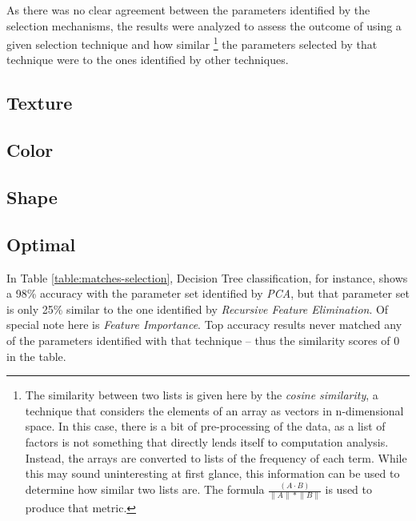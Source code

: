 \documentclass[letterpaper]{article}
\begin{document}
{As there was no clear agreement between the parameters identified by the selection mechanisms, the results were analyzed to assess the outcome of using a given selection technique and how similar 
\footnote{The similarity between two lists is given here by the \textit{cosine similarity}, a technique that considers the elements of an array as vectors in n-dimensional space. In this case, there is a bit of pre-processing of the data, as a list of factors is not something that directly lends itself to computation analysis. Instead, the arrays are converted to lists of the frequency of each term. While this may sound uninteresting at first glance, this information can be used to determine how similar two lists are. The formula $\frac {(A \cdot B)} { \lVert A \rVert * \lVert B \rVert }$ is used to produce that metric.}
the parameters selected by that technique were to the ones identified by other techniques. 

\subsection{Texture}
\subsection{Color}
\subsection{Shape}
\subsection{Optimal}

In Table \ref{table:matches-selection}, Decision Tree classification, for instance, shows a 98\% accuracy with the parameter set identified by \textit{PCA}, but that parameter set is only 25\% similar to the one identified by \textit{Recursive Feature Elimination}. Of special note here is \textit{Feature Importance}. Top accuracy results never matched any of the parameters identified with that technique -- thus the similarity scores of 0 in the table.

\begin{tiny}


\end{tiny}}
\end{document}
